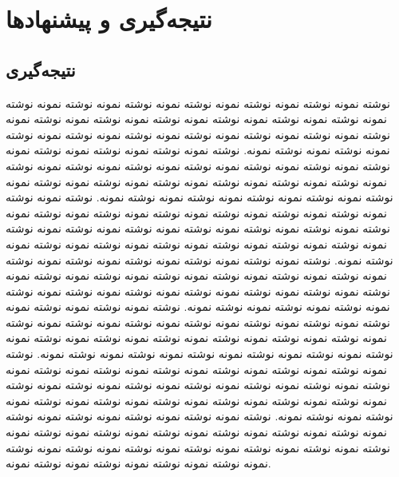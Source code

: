 \chapter{نتیجه‌گیری و پیشنهادها}
\section{‌نتیجه‌گیری}
نوشته نمونه نوشته نمونه نوشته نمونه نوشته نمونه نوشته نمونه نوشته نمونه نوشته نمونه نوشته نمونه نوشته نمونه نوشته نمونه نوشته نمونه نوشته نمونه نوشته نمونه نوشته نمونه نوشته نمونه نوشته نمونه نوشته نمونه نوشته نمونه نوشته نمونه نوشته نمونه نوشته نمونه نوشته نمونه. نوشته نمونه نوشته نمونه نوشته نمونه نوشته نمونه نوشته نمونه نوشته نمونه نوشته نمونه نوشته نمونه نوشته نمونه نوشته نمونه نوشته نمونه نوشته نمونه نوشته نمونه نوشته نمونه نوشته نمونه نوشته نمونه نوشته نمونه نوشته نمونه نوشته نمونه نوشته نمونه نوشته نمونه نوشته نمونه. نوشته نمونه نوشته نمونه نوشته نمونه نوشته نمونه نوشته نمونه نوشته نمونه نوشته نمونه نوشته نمونه نوشته نمونه نوشته نمونه نوشته نمونه نوشته نمونه نوشته نمونه نوشته نمونه نوشته نمونه نوشته نمونه نوشته نمونه نوشته نمونه نوشته نمونه نوشته نمونه نوشته نمونه نوشته نمونه. نوشته نمونه نوشته نمونه نوشته نمونه نوشته نمونه نوشته نمونه نوشته نمونه نوشته نمونه نوشته نمونه نوشته نمونه نوشته نمونه نوشته نمونه نوشته نمونه نوشته نمونه نوشته نمونه نوشته نمونه نوشته نمونه نوشته نمونه نوشته نمونه نوشته نمونه نوشته نمونه نوشته نمونه نوشته نمونه. نوشته نمونه نوشته نمونه نوشته نمونه نوشته نمونه نوشته نمونه نوشته نمونه نوشته نمونه نوشته نمونه نوشته نمونه نوشته نمونه نوشته نمونه نوشته نمونه نوشته نمونه نوشته نمونه نوشته نمونه نوشته نمونه نوشته نمونه نوشته نمونه نوشته نمونه نوشته نمونه نوشته نمونه نوشته نمونه. نوشته نمونه نوشته نمونه نوشته نمونه نوشته نمونه نوشته نمونه نوشته نمونه نوشته نمونه نوشته نمونه نوشته نمونه نوشته نمونه نوشته نمونه نوشته نمونه نوشته نمونه نوشته نمونه نوشته نمونه نوشته نمونه نوشته نمونه نوشته نمونه نوشته نمونه نوشته نمونه نوشته نمونه نوشته نمونه. نوشته نمونه نوشته نمونه نوشته نمونه نوشته نمونه نوشته نمونه نوشته نمونه نوشته نمونه نوشته نمونه نوشته نمونه نوشته نمونه نوشته نمونه نوشته نمونه نوشته نمونه نوشته نمونه نوشته نمونه نوشته نمونه نوشته نمونه نوشته نمونه نوشته نمونه نوشته نمونه نوشته نمونه نوشته نمونه.


